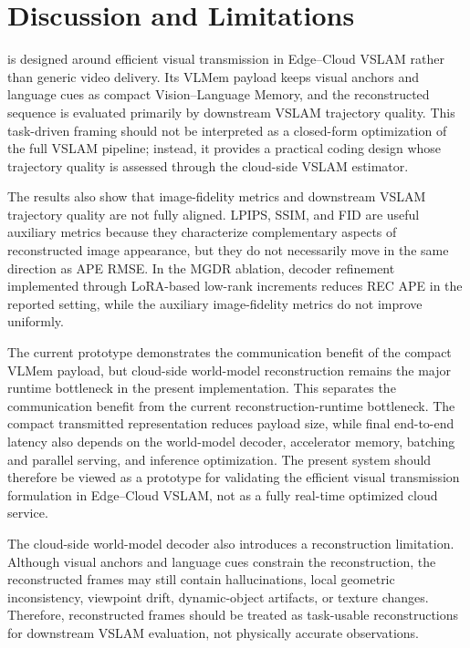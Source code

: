 
\section{Discussion and Limitations}
\label{sec:discussion}

\VLMemCodec{} is designed around efficient visual transmission in Edge--Cloud VSLAM rather than generic video delivery. Its VLMem payload keeps visual anchors and language cues as compact Vision--Language Memory, and the reconstructed sequence is evaluated primarily by downstream VSLAM trajectory quality. This task-driven framing should not be interpreted as a closed-form optimization of the full VSLAM pipeline; instead, it provides a practical coding design whose trajectory quality is assessed through the cloud-side VSLAM estimator.

The results also show that image-fidelity metrics and downstream VSLAM trajectory quality are not fully aligned. LPIPS, SSIM, and FID are useful auxiliary metrics because they characterize complementary aspects of reconstructed image appearance, but they do not necessarily move in the same direction as APE RMSE. In the MGDR ablation, decoder refinement implemented through LoRA-based low-rank increments reduces REC APE in the reported setting, while the auxiliary image-fidelity metrics do not improve uniformly.

The current prototype demonstrates the communication benefit of the compact VLMem payload, but cloud-side world-model reconstruction remains the major runtime bottleneck in the present implementation. This separates the communication benefit from the current reconstruction-runtime bottleneck. The compact transmitted representation reduces payload size, while final end-to-end latency also depends on the world-model decoder, accelerator memory, batching and parallel serving, and inference optimization. The present system should therefore be viewed as a prototype for validating the efficient visual transmission formulation in Edge--Cloud VSLAM, not as a fully real-time optimized cloud service.

The cloud-side world-model decoder also introduces a reconstruction limitation. Although visual anchors and language cues constrain the reconstruction, the reconstructed frames may still contain hallucinations, local geometric inconsistency, viewpoint drift, dynamic-object artifacts, or texture changes. Therefore, reconstructed frames should be treated as task-usable reconstructions for downstream VSLAM evaluation, not physically accurate observations.

